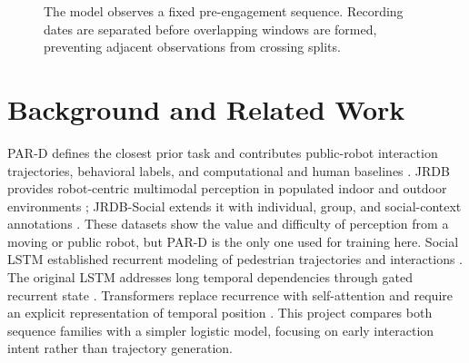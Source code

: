 \documentclass[final]{article}
\begin{document}
\begin{figure}[!ht]
  \centering
  \caption{The model observes a fixed pre-engagement sequence. Recording dates are separated before overlapping windows are formed, preventing adjacent observations from crossing splits.}
  \label{fig:pipeline}
\end{figure}

\section*{Background and Related Work}

PAR-D defines the closest prior task and contributes public-robot interaction trajectories, behavioral labels, and computational and human baselines \citep{thompson2024pard}. JRDB provides robot-centric multimodal perception in populated indoor and outdoor environments \citep{martinmartin2019jrdb}; JRDB-Social extends it with individual, group, and social-context annotations \citep{jahangard2024jrdbsocial}. These datasets show the value and difficulty of perception from a moving or public robot, but PAR-D is the only one used for training here. Social LSTM established recurrent modeling of pedestrian trajectories and interactions \citep{alahi2016social}. The original LSTM addresses long temporal dependencies through gated recurrent state \citep{hochreiter1997lstm}. Transformers replace recurrence with self-attention and require an explicit representation of temporal position \citep{vaswani2017attention}. This project compares both sequence families with a simpler logistic model, focusing on early interaction intent rather than trajectory generation.
\end{document}
